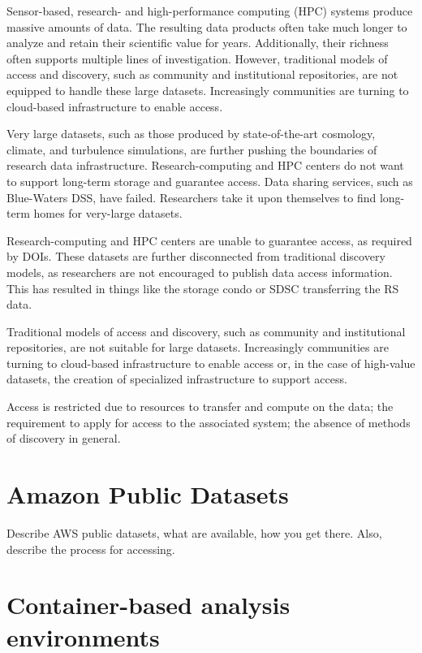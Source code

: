 \documentclass{sig-alternate}
\begin{document}
Sensor-based, research- and high-performance computing (HPC) systems produce massive amounts of data. The resulting data products often take much longer to analyze and retain their scientific value for years. Additionally, their richness often supports multiple lines of investigation. However, traditional models of access and discovery, such as community and institutional repositories, are not equipped to handle these large datasets. Increasingly communities are turning to cloud-based infrastructure to enable access.  

Very large datasets, such as those produced by state-of-the-art cosmology, climate, and turbulence simulations, are further pushing the boundaries of research data infrastructure.   Research-computing and HPC centers do not want to support long-term storage and guarantee access.  Data sharing services, such as Blue-Waters DSS, have failed. Researchers take it upon themselves to find long-term homes for very-large datasets.

Research-computing and HPC centers are unable to guarantee access, as required by DOIs. These datasets are further disconnected from traditional discovery models, as researchers are not encouraged to publish data access information. This has resulted in things like the storage condo or SDSC transferring the RS data.

Traditional models of access and discovery, such as community and institutional repositories, are not suitable for large datasets. Increasingly communities are turning to cloud-based infrastructure to enable access or, in the case of high-value datasets, the creation of specialized infrastructure to support access.

Access is restricted due to resources to transfer and compute on the data; the requirement to apply for access to the associated system; the absence of methods of discovery in general.

\section{Amazon Public Datasets}

Describe AWS public datasets, what are available, how you get there. Also, describe the process for accessing.


\section{Container-based analysis environments}
\end{document}
